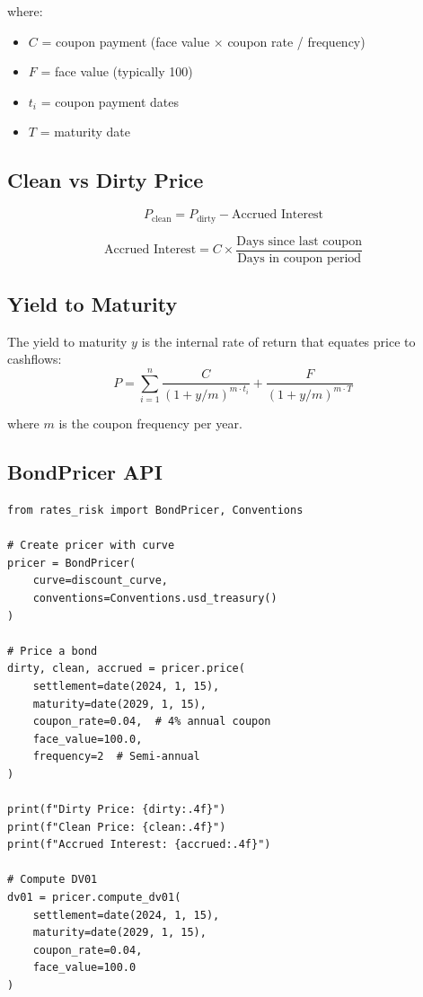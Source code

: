 \documentclass[12pt,a4paper]{report}
\begin{document}
where:
\begin{itemize}
    \item $C$ = coupon payment (face value $\times$ coupon rate / frequency)
    \item $F$ = face value (typically 100)
    \item $t_i$ = coupon payment dates
    \item $T$ = maturity date
\end{itemize}

\subsection{Clean vs Dirty Price}

\begin{equation}
    P_{\text{clean}} = P_{\text{dirty}} - \text{Accrued Interest}
\end{equation}

\begin{equation}
    \text{Accrued Interest} = C \times \frac{\text{Days since last coupon}}{\text{Days in coupon period}}
\end{equation}

\subsection{Yield to Maturity}

The yield to maturity $y$ is the internal rate of return that equates price to cashflows:
\begin{equation}
    P = \sum_{i=1}^{n} \frac{C}{(1+y/m)^{m \cdot t_i}} + \frac{F}{(1+y/m)^{m \cdot T}}
\end{equation}

where $m$ is the coupon frequency per year.

\subsection{BondPricer API}

\begin{lstlisting}
from rates_risk import BondPricer, Conventions

# Create pricer with curve
pricer = BondPricer(
    curve=discount_curve,
    conventions=Conventions.usd_treasury()
)

# Price a bond
dirty, clean, accrued = pricer.price(
    settlement=date(2024, 1, 15),
    maturity=date(2029, 1, 15),
    coupon_rate=0.04,  # 4% annual coupon
    face_value=100.0,
    frequency=2  # Semi-annual
)

print(f"Dirty Price: {dirty:.4f}")
print(f"Clean Price: {clean:.4f}")
print(f"Accrued Interest: {accrued:.4f}")

# Compute DV01
dv01 = pricer.compute_dv01(
    settlement=date(2024, 1, 15),
    maturity=date(2029, 1, 15),
    coupon_rate=0.04,
    face_value=100.0
)
\end{lstlisting}
\end{document}
